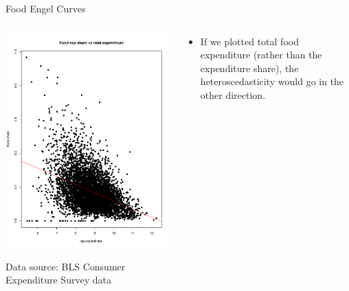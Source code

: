 \begin{frame}{Food Engel Curves}
\begin{columns}
\begin{column}{0.5\textwidth}
	\includegraphics[width=.7\textwidth]{engle1.pdf}	

{\tiny Data source: BLS Consumer Expenditure Survey data}

\end{column}
\begin{column}{0.5\textwidth}
\begin{itemize}
	\item If we plotted total food expenditure (rather than the expenditure share), the heteroscedasticity would go in the other direction.
\end{itemize}
\end{column}
\end{columns}
\end{frame}





